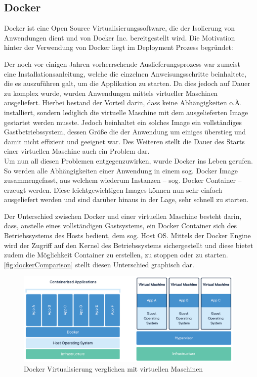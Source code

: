 		\subsection{Docker} %
			
			Docker ist eine Open Source Virtualisierungssoftware, die der Isolierung von Anwendungen dient und von Docker Inc. bereitgestellt wird. Die Motivation hinter der Verwendung von Docker liegt im Deployment Prozess begründet: 
			
			Der noch vor einigen Jahren vorherrschende Auslieferungsprozess war zumeist eine Installationsanleitung, welche die einzelnen Anweisungsschritte beinhaltete, die es auszuführen galt, um die Applikation zu starten. Da dies jedoch auf Dauer zu komplex wurde, wurden Anwendungen mittels virtueller Maschinen ausgeliefert. Hierbei bestand der Vorteil darin, dass keine Abhängigkeiten o.Ä. installiert, sondern lediglich die virtuelle Maschine mit dem ausgelieferten Image gestartet werden musste. Jedoch beinhaltet ein solches Image ein vollständiges Gastbetriebssystem, dessen Größe die der Anwendung um einiges überstieg und damit nicht effizient und geeignet war. Des Weiteren stellt die Dauer des Starts einer virtuellen Maschine auch ein Problem dar. \\
			Um nun all diesen Problemen entgegenzuwirken, wurde Docker ins Leben gerufen. So werden alle Abhängigkeiten einer Anwendung in einem sog. Docker Image zusammengefasst, aus welchem wiederum Instanzen -- sog. Docker Container -- erzeugt werden. Diese leichtgewichtigen Images können nun sehr einfach ausgeliefert werden und sind darüber hinaus in der Lage, sehr schnell zu starten. \cite{ThomasClaudiusHuber.2019}
			
			Der Unterschied zwischen Docker und einer virtuellen Maschine besteht darin, dass, anstelle eines vollständigen Gastsystems, ein Docker Container sich des Betriebssystems des Hosts bedient, dem sog. Host OS. Mittels der Docker Engine wird der Zugriff auf den Kernel des Betriebssystems sichergestellt und diese bietet zudem die Möglichkeit Container zu erstellen, zu stoppen oder zu starten. \autoref{fig:dockerComparison} stellt diesen Unterschied graphisch dar. \cite{Turnbull.2014}
			
			\begin{figure}[ht!]
				\centering
				\includegraphics[width=1\textwidth]{images/docker-containerized-and-vm-transparent-bg.png}
				\caption{Docker Virtualisierung verglichen mit virtuellen Maschinen \cite{DockerInc..2020}}
				\label{fig:dockerComparison}
			\end{figure} 
			
